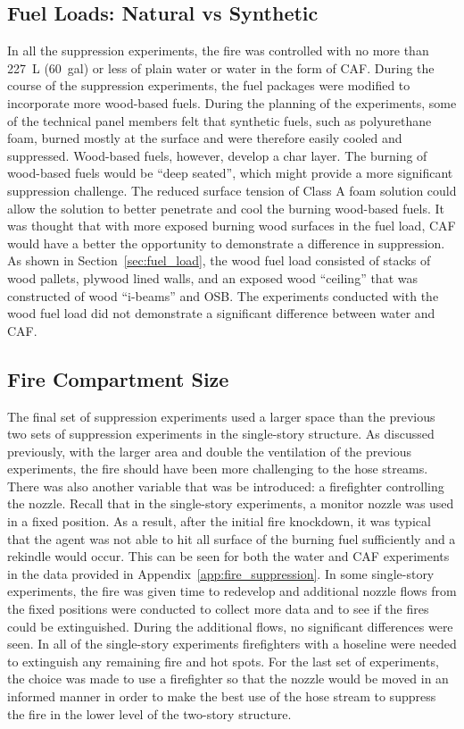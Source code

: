 \documentclass[12pt,oneside]{book}
\begin{document}
\subsection{Fuel Loads: Natural vs Synthetic}
In all the suppression experiments, the fire was controlled with no more than 227~L (60~gal) or less of plain water or water in the form of CAF. During the course of the suppression experiments, the fuel packages were modified to incorporate more wood-based fuels. During the planning of the experiments, some of the technical panel members felt that synthetic fuels, such as polyurethane foam, burned mostly at the surface and were therefore easily cooled and suppressed. Wood-based fuels, however, develop a char layer. The burning of wood-based fuels would be ``deep seated'', which might provide a more significant suppression challenge. The reduced surface tension of Class A foam solution could allow the solution to better penetrate and cool the burning wood-based fuels. It was thought that with more exposed burning wood surfaces in the fuel load, CAF would have a better the opportunity to demonstrate a difference in suppression. As shown in Section~\ref{sec:fuel_load}, the wood fuel load consisted of stacks of wood pallets, plywood lined walls, and an exposed wood ``ceiling'' that was constructed of wood ``i-beams'' and OSB. The experiments conducted with the wood fuel load did not demonstrate a significant difference between water and CAF.  

\subsection{Fire Compartment Size}
The final set of suppression experiments used a larger space than the previous two sets of suppression experiments in the single-story structure. As discussed previously, with the larger area and double the ventilation of the previous experiments, the fire should have been more challenging to the hose streams. There was also another variable that was be introduced: a firefighter controlling the nozzle. Recall that in the single-story experiments, a monitor nozzle was used in a fixed position. As a result, after the initial fire knockdown, it was typical that the agent was not able to hit all surface of the burning fuel sufficiently and a rekindle would occur. This can be seen for both the water and CAF experiments in the data provided in Appendix~\ref{app:fire_suppression}. In some single-story experiments, the fire was given time to redevelop and additional nozzle flows from the fixed positions were conducted to collect more data and to see if the fires could be extinguished. During the additional flows, no significant differences were seen. In all of the single-story experiments firefighters with a hoseline were needed to extinguish any remaining fire and hot spots. For the last set of experiments, the choice was made to use a firefighter so that the nozzle would be moved in an informed manner in order to make the best use of the hose stream to suppress the fire in the lower level of the two-story structure.  
\end{document}
